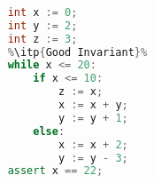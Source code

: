 \begin{lstlisting}[language=C++,basicstyle=\ttfamily,keywordstyle=\color{blue}, escapechar=\%]  % Start your code-block
	
	int x := 0;
	int y := 2;
	int z := 3;
	%\itp{Good Invariant}%
	while x <= 20:
		if x <= 10:
			z := x;
			x := x + y;
			y := y + 1;
		else:
			x := x + 2;
			y := y - 3;
	assert x == 22;
	\end{lstlisting}